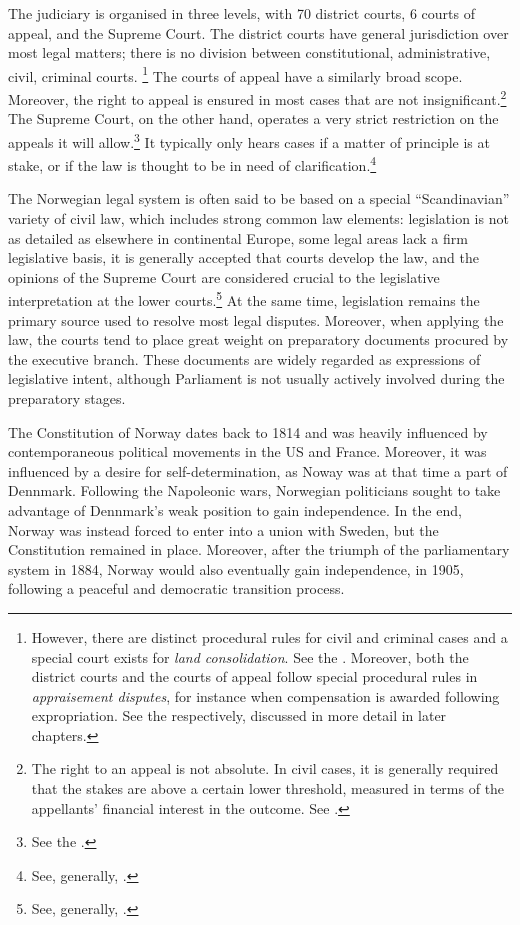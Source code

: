 The judiciary is organised in three levels, with 70 district courts, 6 courts of appeal, and the Supreme Court. The district courts have general jurisdiction over most legal matters; there is no division between constitutional, administrative, civil, criminal courts. \footnote{However, there are distinct procedural rules for civil and criminal cases and a special court exists for {\it land consolidation}. See the \cite{lca79}. Moreover, both the district courts and the courts of appeal follow special procedural rules in {\it appraisement disputes}, for instance when compensation is awarded following expropriation. See the \cite{aa17} respectively, discussed in more detail in later chapters.} The courts of appeal have a similarly broad scope. Moreover, the right to appeal is ensured in most cases that are not insignificant.\footnote{The right to an appeal is not absolute. In civil cases, it is generally required that the stakes are above a certain lower threshold, measured in terms of the appellants' financial interest in the outcome. See \cite[29-13]{da05}.} The Supreme Court, on the other hand, operates a very strict restriction on the appeals it will allow.\footnote{See the \cite[30-4]{da05}.} It typically only hears cases if a matter of principle is at stake, or if the law is thought to be in need of clarification.\footnote{See, generally, \cite{skoghoy08}.}

The Norwegian legal system is often said to be based on a special ``Scandinavian'' variety of civil law, which includes strong common law elements: legislation is not as detailed as elsewhere in continental Europe, some legal areas lack a firm legislative basis, it is generally accepted that courts develop the law, and the opinions of the Supreme Court are considered crucial to the legislative interpretation at the lower courts.\footnote{See, generally, \cite{bernitz07}.} At the same time, legislation remains the primary source used to resolve most legal disputes. Moreover, when applying the law, the courts tend to place great weight on preparatory documents procured by the executive branch. These documents are widely regarded as expressions of legislative intent, although Parliament is not usually actively involved during the preparatory stages.

The Constitution of Norway dates back to 1814 and was heavily influenced by contemporaneous political movements in the US and France. Moreover, it was influenced by a desire for self-determination, as Noway was at that time a part of Dennmark. Following the Napoleonic wars, Norwegian politicians sought to take advantage of Dennmark's weak position to gain independence. In the end, Norway was instead forced to enter into a union with Sweden, but the Constitution remained in place. Moreover, after the triumph of the parliamentary system in 1884, Norway would also eventually gain independence, in 1905, following a peaceful and democratic transition process.

